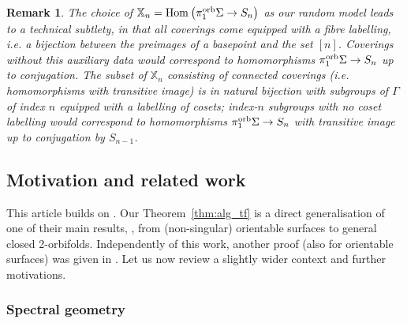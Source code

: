 \documentclass{amsart}
\newtheorem{remark}[conjecture]{Remark}
\newcommand{\covers}{\mathbb{X}_n}
\newcommand{\Hom}[3][]{\tn{Hom}_{#1}\left(#2\to #3\right)}
\newcommand{\pio}{\pi_1^{\textnormal{orb}}}
\newcommand{\tn}{\textnormal}
\begin{document}
\begin{remark}\label{rmk:fibre_label}
The choice of $\covers=\Hom{\pio\Sigma}{S_n}$ as our random model leads to a technical subtlety, in that all coverings come equipped with a fibre labelling, i.e. a bijection between the preimages of a basepoint and the set $[n]$. Coverings without this auxiliary data would correspond to homomorphisms $\pio\Sigma\to S_n$ up to conjugation. The subset of $\covers$ consisting of connected coverings (i.e. homomorphisms with transitive image) is in natural bijection with subgroups of $\Gamma$ of index $n$ equipped with a labelling of cosets; index-$n$ subgroups with no coset labelling would correspond to homomorphisms $\pio\Sigma\to S_n$ with transitive image up to conjugation by $S_{n-1}$.
\end{remark}

\subsection{Motivation and related work}

This article builds on \cite{asymptotic_stats_random_covering_surfaces_MageePuder23}. Our Theorem~\ref{thm:alg_tf} is a direct generalisation of one of their main results, \cite[Theorem 1.3]{asymptotic_stats_random_covering_surfaces_MageePuder23}, from (non-singular) orientable surfaces to general closed 2-orbifolds. Independently of this work, another proof (also for orientable surfaces) was given in \cite{word_maps_surface_rels_symm_gps_Cassidy26}. Let us now review a slightly wider context and further motivations.

\subsubsection{Spectral geometry}
\end{document}
